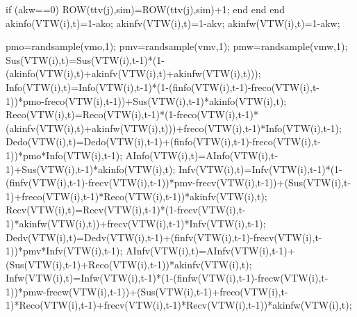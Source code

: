                                                          
                                                          if (akw==0)
                                                             ROW(ttv(j),sim)=ROW(ttv(j),sim)+1;
                                                          end
                                                     end                                           
                                          end
                                          akinfo(VTW(i),t)=1-ako;
                                          akinfv(VTW(i),t)=1-akv;
                                          akinfw(VTW(i),t)=1-akw;
                                          
                                          pmo=randsample(vmo,1);
                                          pmv=randsample(vmv,1); 
                                          pmw=randsample(vmw,1);                                        
                                          Sus(VTW(i),t)=Sus(VTW(i),t-1)*(1-(akinfo(VTW(i),t)+akinfv(VTW(i),t)+akinfw(VTW(i),t)));
                                          Info(VTW(i),t)=Info(VTW(i),t-1)*(1-(finfo(VTW(i),t-1)-freco(VTW(i),t-1))*pmo-freco(VTW(i),t-1))+Sus(VTW(i),t-1)*akinfo(VTW(i),t);
                                          Reco(VTW(i),t)=Reco(VTW(i),t-1)*(1-freco(VTW(i),t-1)*(akinfv(VTW(i),t)+akinfw(VTW(i),t)))+freco(VTW(i),t-1)*Info(VTW(i),t-1);
                                          Dedo(VTW(i),t)=Dedo(VTW(i),t-1)+(finfo(VTW(i),t-1)-freco(VTW(i),t-1))*pmo*Info(VTW(i),t-1);
                                          AInfo(VTW(i),t)=AInfo(VTW(i),t-1)+Sus(VTW(i),t-1)*akinfo(VTW(i),t);                              
                                          Infv(VTW(i),t)=Infv(VTW(i),t-1)*(1-(finfv(VTW(i),t-1)-frecv(VTW(i),t-1))*pmv-frecv(VTW(i),t-1))+(Sus(VTW(i),t-1)+freco(VTW(i),t-1)*Reco(VTW(i),t-1))*akinfv(VTW(i),t);
                                          Recv(VTW(i),t)=Recv(VTW(i),t-1)*(1-frecv(VTW(i),t-1)*akinfw(VTW(i),t))+frecv(VTW(i),t-1)*Infv(VTW(i),t-1);
                                          Dedv(VTW(i),t)=Dedv(VTW(i),t-1)+(finfv(VTW(i),t-1)-frecv(VTW(i),t-1))*pmv*Infv(VTW(i),t-1);
                                          AInfv(VTW(i),t)=AInfv(VTW(i),t-1)+(Sus(VTW(i),t-1)+Reco(VTW(i),t-1))*akinfv(VTW(i),t);
                                          Infw(VTW(i),t)=Infw(VTW(i),t-1)*(1-(finfw(VTW(i),t-1)-frecw(VTW(i),t-1))*pmw-frecw(VTW(i),t-1))+(Sus(VTW(i),t-1)+freco(VTW(i),t-1)*Reco(VTW(i),t-1)+frecv(VTW(i),t-1)*Recv(VTW(i),t-1))*akinfw(VTW(i),t);
